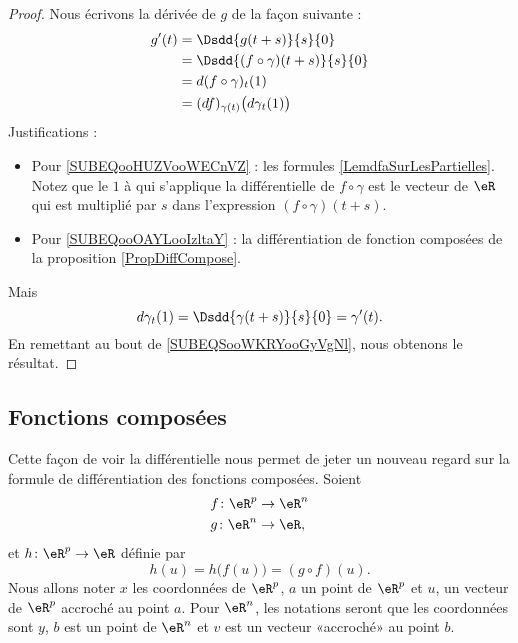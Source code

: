 \begin{proof}
	Nous écrivons la dérivée de \( g\) de la façon suivante :
	\begin{subequations}        \label{SUBEQSooWKRYooGyVgNl}
		\begin{align}
			g'(t) & =\Dsdd{ g(t+s) }{s}{0}                                                \\
			      & =\Dsdd{ (f\circ \gamma)(t+s) }{s}{0}                                  \\
			      & =d(f\circ \gamma)_t(1) \label{SUBEQooHUZVooWECnVZ}                    \\
			      & =(df)_{\gamma(t)}\big( d\gamma_t(1) \big) \label{SUBEQooOAYLooIzltaY} \\
		\end{align}
	\end{subequations}
	Justifications :
	\begin{itemize}
		\item Pour \eqref{SUBEQooHUZVooWECnVZ} : les formules \eqref{LemdfaSurLesPartielles}. Notez que le \( 1\) à qui s'applique la différentielle de \( f\circ\gamma\) est le vecteur de \( \eR\) qui est multiplié par \( s\) dans l'expression \( (f\circ\gamma)(t+s)\).
		\item
		      Pour \eqref{SUBEQooOAYLooIzltaY} : la différentiation de fonction composées de la proposition \ref{PropDiffCompose}.
	\end{itemize}
	Mais
	\begin{equation}
		d\gamma_t(1)=\Dsdd{ \gamma(t+s) }{s}{0}=\gamma'(t).
	\end{equation}
	En remettant au bout de \eqref{SUBEQSooWKRYooGyVgNl}, nous obtenons le résultat.
\end{proof}

\subsection{Fonctions composées}

Cette façon de voir la différentielle nous permet de jeter un nouveau regard sur la formule de différentiation des fonctions composées. Soient
\begin{equation}
	\begin{aligned}[]
		f\colon \eR^p & \to \eR^n \\
		g\colon \eR^n & \to \eR,
	\end{aligned}
\end{equation}
et \( h\colon \eR^p\to \eR\) définie par
\begin{equation}
	h(u)=h\big( f(u) \big)=(g\circ f)(u).
\end{equation}
Nous allons noter \( x\) les coordonnées de \( \eR^p\), \( a\) un point de \( \eR^p\) et \( u\), un vecteur de \( \eR^p\) accroché au point \( a\). Pour \( \eR^n\), les notations seront que les coordonnées sont \( y\), \( b\) est un point de \( \eR^n\) et \( v\) est un vecteur «accroché» au point \( b\).

